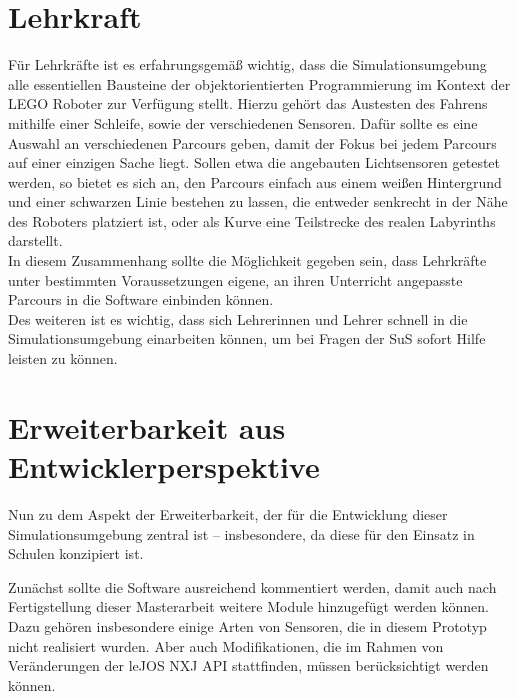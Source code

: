 \documentclass[paper=a4, DIV=calc, BCOR=12mm, twoside=on, onecolumn=on, open = right, titlepage =on, parskip =half-, headsepline = on, footsepline = off, chapterprefix = off, appendixprefix = on, fontsize = 12pt, numbers = noenddot, abstract = on]{scrbook}
\begin{document}
\vspace*{-2ex}
\par \singlespacing
\section{Lehrkraft}
\label{sec:lehrkraft}
\vspace*{-1ex}
\par \onehalfspacing
Für Lehrkräfte ist es erfahrungsgemäß wichtig, dass die Simulationsumgebung alle essentiellen Bausteine der objektorientierten Programmierung im Kontext der \textsc{LEGO} Roboter zur Verfügung stellt. Hierzu gehört das Austesten des Fahrens mithilfe einer Schleife, sowie der verschiedenen Sensoren. Dafür sollte es eine Auswahl an verschiedenen Parcours geben, damit der Fokus bei jedem Parcours auf einer einzigen Sache liegt. Sollen etwa die angebauten Lichtsensoren getestet werden, so bietet es sich an, den Parcours einfach aus einem weißen Hintergrund und einer schwarzen Linie bestehen zu lassen, die entweder senkrecht in der Nähe des Roboters platziert ist, oder als Kurve eine Teilstrecke des realen Labyrinths darstellt.\\
In diesem Zusammenhang sollte die Möglichkeit gegeben sein, dass Lehrkräfte unter bestimmten Voraussetzungen eigene, an ihren Unterricht angepasste Parcours in die Software einbinden können.\\
Des weiteren ist es wichtig, dass sich Lehrerinnen und Lehrer schnell in die Simulationsumgebung einarbeiten können, um bei Fragen der SuS sofort Hilfe leisten zu können. %



\par \singlespacing
\section{Erweiterbarkeit aus Entwicklerperspektive} 
\label{sec:erweiterbarkeit}
\onehalfspacing
Nun zu dem Aspekt der Erweiterbarkeit, der für die Entwicklung dieser Simulationsumgebung zentral ist -- insbesondere, da diese für den Einsatz in Schulen konzipiert ist.

Zunächst sollte die Software ausreichend kommentiert werden, damit auch nach Fertigstellung dieser Masterarbeit weitere Module hinzugefügt werden können. Dazu gehören insbesondere einige Arten von Sensoren, die in diesem Prototyp nicht realisiert wurden. Aber auch Modifikationen, die im Rahmen von Veränderungen der leJOS NXJ API stattfinden, müssen berücksichtigt werden können.
\end{document}
